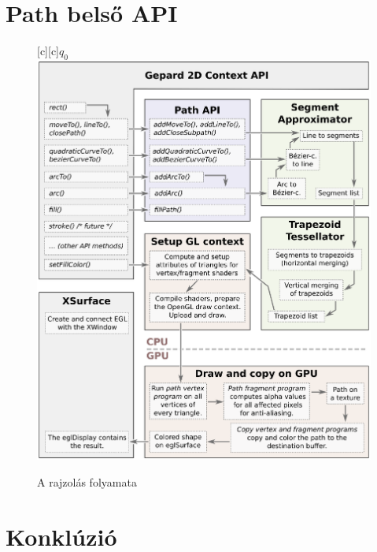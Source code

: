 \documentclass[12pt]{report}
\theoremstyle{definition}
\begin{document}
    \chapter{Path belső API}

    \begin{figure}[h]
    \centering
    [c][c]{$q_0$}
    \includegraphics[scale=0.6]{dataflow.eps}
    \caption{\label{dataflow-diagram} A rajzolás folyamata}
    \end{figure}



    \chapter{Konklúzió}


\end{document}
